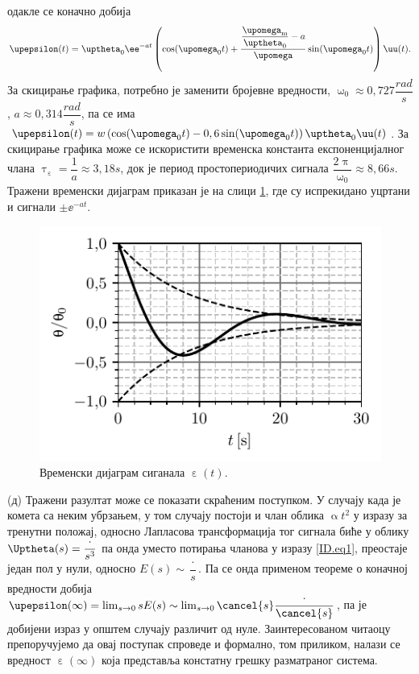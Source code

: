 одакле се коначно добија 
\begin{equation}
    \upepsilon(t) = 
    \uptheta_0 
    \ee^{-at}
    \left(
        \cos(\upomega_0 t)
        + 
        \dfrac{ \dfrac{\upomega_{\rm m}}{\uptheta_0} - a  }{\upomega}
        \sin(\upomega_0 t)
    \right) \uu(t).
\end{equation}
За скицирање графика, потребно је заменити бројевне вредности, 
$\upomega_0 \approx 0,727 \unit{\dfrac{rad}{s}}$, 
$a \approx 0,314 \unit{\dfrac{rad}{s}}$, па се има 
$\upepsilon(t) = w
\left(
    \cos(\upomega_0 t) 
    -
    0,6\sin(\upomega_0 t)
\right) 
\uptheta_0 
\uu(t)$. За скицирање графика може се искористити временска константа експоненцијалног члана 
$\uptau_{\upepsilon} = \dfrac{1}{a} \approx 3,18\unit{s}$, док је период простопериодичих сигнала 
$\dfrac{2\uppi}{\upomega_0} \approx 8,66\unit{s}$. Тражени временски дијаграм приказан је на слици
\ref{fig:\ID.res}, где су испрекидано уцртани и сигнали $\pm \ee^{-at}$.
\begin{figure}[ht!]
    \centering
    \includegraphics{fig/teleskop_plot.pdf}
    \caption{Временски дијаграм сиганала $\upepsilon(t)$.}
    \label{fig:\ID.res}
\end{figure}

(д) Тражени разултат може се показати скраћеним поступком. У случају када је комета са неким убрзањем, у том случају постоји и члан облика 
$\upalpha t^2$ у изразу за тренутни положај, односно Лапласова трансформација тог сигнала 
биће у облику $\Uptheta(s) = \dfrac{\cdot}{s^3}$ па онда уместо потирања чланова 
у изразу \ref{ID.eq1}, преостаје један пол у нули, односно $E(s) \sim \dfrac{\cdot}{s}$.
Па се онда применом теореме о коначној вредности добија 
$\upepsilon(\infty) = \lim_{s \to 0} s E(s) \sim \lim_{s \to 0} \cancel{s} \dfrac{\cdot}{\cancel{s}}$, па је 
добијени израз у општем случају различит од нуле. Заинтересованом читаоцу препоручујемо да овај поступак спроведе и 
формално, том приликом, налази се вредност $\upepsilon(\infty)$ која представља констатну грешку разматраног система. 
